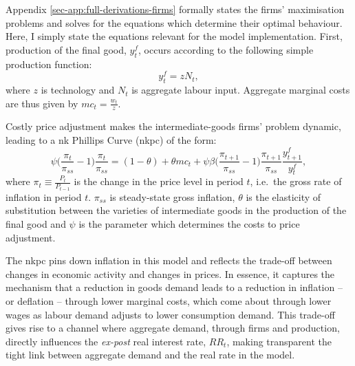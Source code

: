 \documentclass[12pt]{article} %
\numberwithin{equation}{section} %
\numberwithin{figure}{section}
\numberwithin{table}{section}
\begin{document}
Appendix \ref{sec-app:full-derivations-firms} formally states the firms' maximisation problems and solves for the equations which determine their optimal behaviour. Here, I simply state the equations relevant for the model implementation. First, production of the final good, $y_t^f$, occurs according to the following simple production function:
\begin{equation}
    y_t^f = z N_t, \label{eq:firms-production}
\end{equation}
where $z$ is technology and $N_t$ is aggregate labour input. Aggregate marginal costs are thus given by $mc_t = \frac{w_t}{z}$. 

Costly price adjustment makes the intermediate-goods firms' problem dynamic, leading to a \Gls{nk} Phillips Curve (\Gls{nkpc}) of the form:
\begin{equation}
    \psi \Bigg( \frac{\pi_t}{\pi_{ss}} - 1 \Bigg) \frac{\pi_t}{\pi_{ss}} = (1-\theta) + \theta mc_t + \psi \beta \Bigg( \frac{\pi_{t+1}}{\pi_{ss}} - 1 \Bigg) \frac{\pi_{t+1}}{\pi_{ss}} \frac{y_{t+1}^f}{y_t^f}, \label{eq:firms-nkpc}
\end{equation}
where $\pi_t \equiv \frac{P_t}{P_{t-1}}$ is the change in the price level in period $t$, i.e.~the gross rate of inflation in period $t$. $\pi_{ss}$ is steady-state gross inflation, $\theta$ is the elasticity of substitution between the varieties of intermediate goods in the production of the final good and $\psi$ is the parameter which determines the costs to price adjustment.  


The \Gls{nkpc} pins down inflation in this model and reflects the trade-off between changes in economic activity and changes in prices. In essence, it captures the mechanism that a reduction in goods demand leads to a reduction in inflation -- or deflation -- through lower marginal costs, which come about through lower wages as labour demand adjusts to lower consumption demand. This trade-off gives rise to a channel where aggregate demand, through firms and production, directly influences the \textit{ex-post} real interest rate, $RR_t$, making transparent the tight link between aggregate demand and the real rate in the model.

\end{document}
